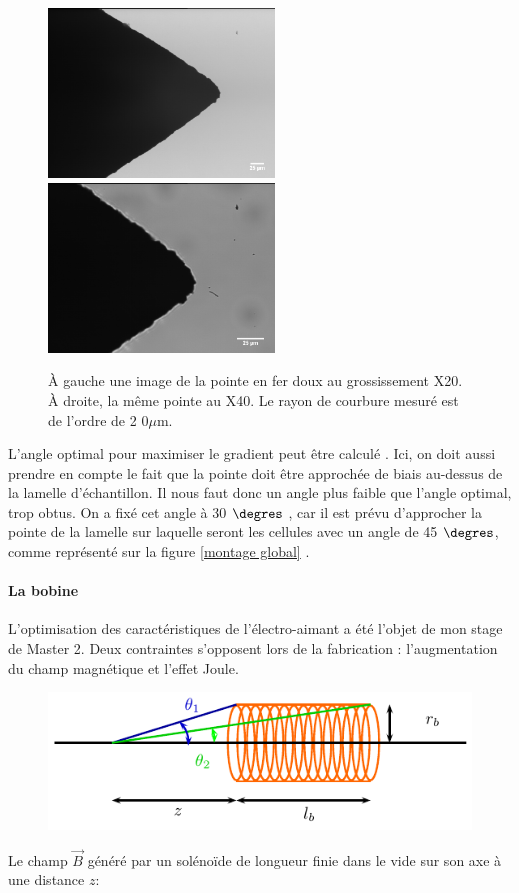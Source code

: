 \documentclass{report}
\begin{document}
	 \begin{figure}[ht!]%
\includegraphics[width=6cm]{pointe1-2011-03-29-20X.png}%
\includegraphics[width=6cm]{pointe1-2011-03-29-40X.png}
\caption{À gauche une image de la pointe en fer doux au grossissement X20. À droite, la même pointe au X40. Le rayon de courbure mesuré est de l'ordre de 2
0$\mu$m.}%
\label{pointe}
\end{figure}
	 
	 L'angle optimal pour maximiser le gradient peut être calculé \cite{magnetisme}. Ici, on doit aussi prendre en compte le fait que la pointe doit être approchée de biais au-dessus de la lamelle d'échantillon. Il nous faut donc un angle plus faible que l'angle optimal, trop obtus. On a fixé cet angle à 30 $\degres$ , car il est prévu d'approcher la pointe de la lamelle sur laquelle seront les cellules avec un angle de 45 $\degres$, comme représenté sur la figure \ref{montage global} .

\paragraph{La bobine}

	L'optimisation des caractéristiques de l'électro-aimant a été l'objet de mon stage de Master 2. 
	Deux contraintes s'opposent lors de la fabrication : l'augmentation du champ magnétique et l'effet Joule. 
	
	\begin{figure}
	\includegraphics[scale=1]{champB.pdf}
	\end{figure}
	Le champ $\vec{B}$ généré par un solénoïde de longueur finie dans le vide sur son axe à une distance $z$:
		
\end{document}

